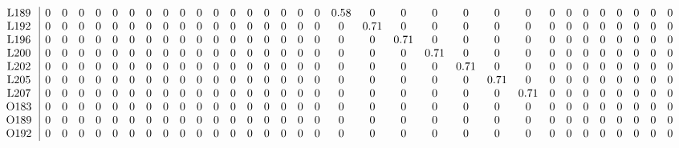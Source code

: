 \begin{table}[H]
\begin{center}
\begin{math}
\begin{array}{c|cccccccccccccccccccccccccccccccc}
\mathrm{L189} \hspace*{2pt} &  0 &  0 &  0 &  0 &  0 &  0 &  0 &  0 &  0 &  0 &  0 &  0 &  0 &  0 &  0 &  0 &  0 &       0.58 &  0 &  0 &  0 &  0 &  0 &  0 &  0 &  0 &  0 &  0 &  0 &  0 &  0 &  0 \\
\mathrm{L192} \hspace*{2pt} &  0 &  0 &  0 &  0 &  0 &  0 &  0 &  0 &  0 &  0 &  0 &  0 &  0 &  0 &  0 &  0 &  0 &  0 &       0.71 &  0 &  0 &  0 &  0 &  0 &  0 &  0 &  0 &  0 &  0 &  0 &  0 &  0 \\
\mathrm{L196} \hspace*{2pt} &  0 &  0 &  0 &  0 &  0 &  0 &  0 &  0 &  0 &  0 &  0 &  0 &  0 &  0 &  0 &  0 &  0 &  0 &  0 &       0.71 &  0 &  0 &  0 &  0 &  0 &  0 &  0 &  0 &  0 &  0 &  0 &  0 \\
\mathrm{L200} \hspace*{2pt} &  0 &  0 &  0 &  0 &  0 &  0 &  0 &  0 &  0 &  0 &  0 &  0 &  0 &  0 &  0 &  0 &  0 &  0 &  0 &  0 &       0.71 &  0 &  0 &  0 &  0 &  0 &  0 &  0 &  0 &  0 &  0 &  0 \\
\mathrm{L202} \hspace*{2pt} &  0 &  0 &  0 &  0 &  0 &  0 &  0 &  0 &  0 &  0 &  0 &  0 &  0 &  0 &  0 &  0 &  0 &  0 &  0 &  0 &  0 &       0.71 &  0 &  0 &  0 &  0 &  0 &  0 &  0 &  0 &  0 &  0 \\
\mathrm{L205} \hspace*{2pt} &  0 &  0 &  0 &  0 &  0 &  0 &  0 &  0 &  0 &  0 &  0 &  0 &  0 &  0 &  0 &  0 &  0 &  0 &  0 &  0 &  0 &  0 &       0.71 &  0 &  0 &  0 &  0 &  0 &  0 &  0 &  0 &  0 \\
\mathrm{L207} \hspace*{2pt} &  0 &  0 &  0 &  0 &  0 &  0 &  0 &  0 &  0 &  0 &  0 &  0 &  0 &  0 &  0 &  0 &  0 &  0 &  0 &  0 &  0 &  0 &  0 &       0.71 &  0 &  0 &  0 &  0 &  0 &  0 &  0 &  0 \\
\mathrm{O183} \hspace*{2pt} &  0 &  0 &  0 &  0 &  0 &  0 &  0 &  0 &  0 &  0 &  0 &  0 &  0 &  0 &  0 &  0 &  0 &  0 &  0 &  0 &  0 &  0 &  0 &  0 &  0 &  0 &  0 &  0 &  0 &  0 &  0 &  0 \\
\mathrm{O189} \hspace*{2pt} &  0 &  0 &  0 &  0 &  0 &  0 &  0 &  0 &  0 &  0 &  0 &  0 &  0 &  0 &  0 &  0 &  0 &  0 &  0 &  0 &  0 &  0 &  0 &  0 &  0 &  0 &  0 &  0 &  0 &  0 &  0 &  0 \\
\mathrm{O192} \hspace*{2pt} &  0 &  0 &  0 &  0 &  0 &  0 &  0 &  0 &  0 &  0 &  0 &  0 &  0 &  0 &  0 &  0 &  0 &  0 &  0 &  0 &  0 &  0 &  0 &  0 &  0 &  0 &  0 &  0 &  0 &  0 &  0 &  0 \\

\end{array}
\end{math}
\end{center}
\end{table}
